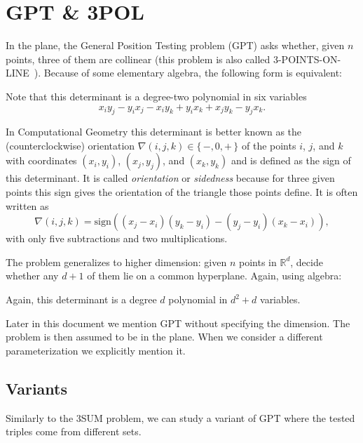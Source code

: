 \section{GPT \& 3POL}%
\label{sec:history:pol}

In the plane, the General Position Testing problem (GPT) asks whether, given
\(n\) points, three of them are collinear (this problem is also called
3-POINTS-ON-LINE~\cite{GO95}).
%
Because of some elementary algebra, the following form is equivalent:
%


Note that this determinant is a degree-two polynomial in six variables
\begin{displaymath}
	x_i y_j - y_i x_j - x_i y_k + y_i x_k + x_j y_k - y_j x_k.
\end{displaymath}

In Computational Geometry this determinant is better known as
the (counterclockwise) orientation \(\nabla(i,j,k) \in \{\, -, 0, +\,\}\) of
the points
\(i\), \(j\), and \(k\) with coordinates \((x_i, y_i)\), \((x_j, y_j)\), and
\((x_k, y_k)\) and is defined as the sign of this determinant.
%
It is called \emph{orientation} or \emph{sidedness}
because for three given points this sign
gives the orientation of the triangle those points define.
%
It is often written as
\begin{displaymath}
    \nabla(i,j,k) = \mathrm{sign}((x_j - x_i)(y_k - y_i) - (y_j - y_i)(x_k - x_i)),
\end{displaymath}
with only five subtractions and two multiplications.

The problem generalizes to higher dimension: given \(n\) points in
\(\mathbb{R}^d\), decide whether any \(d+1\) of them lie on a common
hyperplane. Again, using algebra:
%


Again, this determinant is a degree \(d\) polynomial in
\(d^2 + d\) variables.

Later in this document we mention GPT without specifying the dimension.
The problem is then assumed to be in the plane.
When we consider a different parameterization we explicitly mention it.

\subsection{Variants}%
\label{sec:history:pol:variants}

Similarly to the 3SUM problem, we can study a
variant of GPT where the tested triples come from different sets.
%


